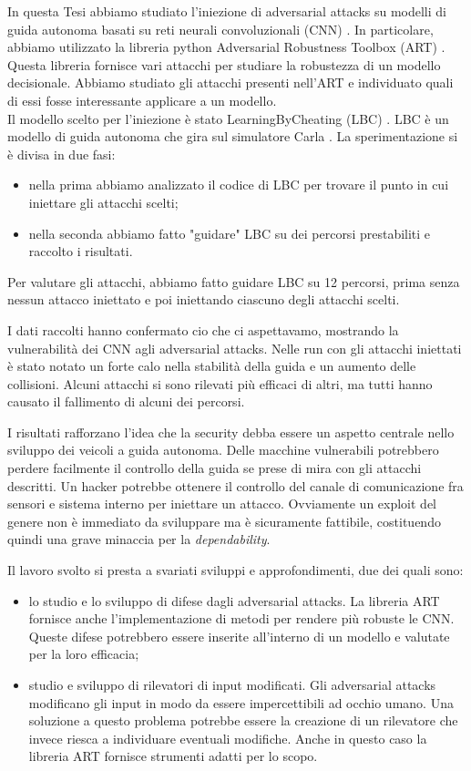 In questa Tesi abbiamo studiato l'iniezione di adversarial attacks su modelli di guida autonoma basati su reti neurali convoluzionali (CNN) \cite{art2018}. 
In particolare, abbiamo utilizzato la libreria python Adversarial Robustness Toolbox (ART) \cite{art2018}. Questa libreria fornisce vari attacchi per studiare la robustezza di un
modello decisionale. Abbiamo studiato gli attacchi presenti nell'ART  e individuato quali di essi fosse interessante applicare a un modello.\\

Il  modello  scelto per l'iniezione è stato LearningByCheating (LBC) \cite{lbc}. LBC è un modello di guida autonoma che gira sul simulatore 
Carla \cite{carla}. La sperimentazione si è divisa in due fasi:\begin{itemize}
    \item nella prima abbiamo analizzato il codice di LBC per trovare il punto  in cui iniettare gli attacchi scelti;
    \item nella seconda abbiamo fatto "guidare" LBC su dei percorsi prestabiliti e raccolto i risultati.
\end{itemize} 

Per valutare gli attacchi, abbiamo fatto guidare LBC su 12 percorsi, prima senza nessun attacco iniettato e poi iniettando ciascuno degli attacchi scelti.

I dati raccolti hanno confermato cio che ci aspettavamo, mostrando la vulnerabilità dei CNN agli adversarial attacks. Nelle run con gli attacchi iniettati è stato notato un forte calo nella stabilità della guida e un aumento delle collisioni.
Alcuni attacchi si sono rilevati più efficaci di altri, ma tutti hanno causato il fallimento di alcuni dei percorsi.

I risultati rafforzano l'idea che la security debba essere un aspetto centrale nello sviluppo 
dei veicoli a guida autonoma. Delle macchine vulnerabili potrebbero perdere facilmente il controllo della guida se prese di mira con gli attacchi descritti. Un hacker potrebbe ottenere il controllo
del canale di comunicazione fra sensori e sistema interno per iniettare un attacco. Ovviamente  un exploit del genere non è immediato da sviluppare ma è sicuramente fattibile, costituendo quindi una grave minaccia
per la \emph{dependability}.

Il lavoro svolto si presta a svariati sviluppi e approfondimenti, due  dei quali sono:\begin{itemize}
    \item lo studio e lo sviluppo di difese dagli adversarial attacks. La libreria ART fornisce anche l'implementazione di metodi per rendere più robuste le CNN.
    Queste difese potrebbero essere inserite all'interno di un modello e valutate per la loro efficacia;
    \item studio e sviluppo di rilevatori di input modificati. Gli adversarial attacks modificano gli input in modo da essere impercettibili ad occhio umano. Una 
    soluzione a questo problema potrebbe essere la creazione di un rilevatore che invece riesca a individuare eventuali modifiche. Anche in questo caso
    la libreria ART  fornisce strumenti adatti per lo scopo.
\end{itemize}